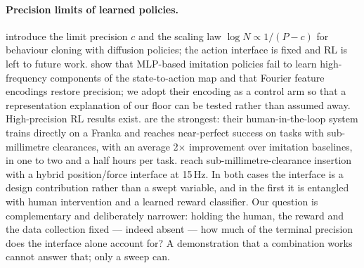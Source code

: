 \documentclass{article}
\begin{document}
\paragraph{Precision limits of learned policies.}
\citet{xu2026curse} introduce the limit precision $c$ and the scaling law
$\log N \propto 1/(P-c)$ for behaviour cloning with diffusion policies; the
action interface is fixed and RL is left to future work.
\citet{gyenes2026fourier} show that MLP-based imitation policies fail to learn
high-frequency components of the state-to-action map and that Fourier feature
encodings \citep{tancik2020fourier} restore precision; we adopt their encoding
as a control arm so that a representation explanation of our floor can be
tested rather than assumed away. High-precision RL results exist. \citet{luo2025hilserl} are the strongest:
their human-in-the-loop system trains directly on a Franka and reaches
near-perfect success on tasks with sub-millimetre clearances, with an average
2$\times$ improvement over imitation baselines, in one to two and a half hours
per task. \citet{brown2026match} reach sub-millimetre-clearance insertion with a
hybrid position/force interface at 15\,Hz. In both cases the interface is a
design contribution rather than a swept variable, and in the first it is
entangled with human intervention and a learned reward classifier. Our question
is complementary and deliberately narrower: holding the human, the reward and
the data collection fixed --- indeed absent --- how much of the terminal
precision does the interface alone account for? A demonstration that a
combination works cannot answer that; only a sweep can.
\end{document}
